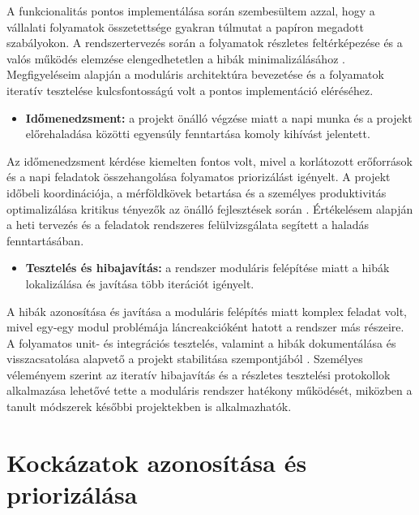A funkcionalitás pontos implementálása során szembesültem azzal, hogy a vállalati folyamatok összetettsége 
gyakran túlmutat a papíron megadott szabályokon. A rendszertervezés során a folyamatok 
részletes feltérképezése és a valós működés elemzése elengedhetetlen a hibák minimalizálásához \cite{Szalay2018,Hajdu2014}. 
Megfigyeléseim alapján a moduláris architektúra bevezetése és a folyamatok iteratív tesztelése kulcsfontosságú volt a pontos implementáció eléréséhez.

\begin{itemize}
    \item \textbf{Időmenedzsment:} a projekt önálló végzése miatt a napi munka és a projekt előrehaladása 
    közötti egyensúly fenntartása komoly kihívást jelentett.
\end{itemize}

Az időmenedzsment kérdése kiemelten fontos volt, mivel a korlátozott erőforrások és a napi feladatok összehangolása 
folyamatos priorizálást igényelt. A projekt időbeli koordinációja, 
a mérföldkövek betartása és a személyes produktivitás optimalizálása kritikus tényezők az önálló fejlesztések során \cite{Kaposi2019,Kovacs2016}. 
Értékelésem alapján a heti tervezés és a feladatok rendszeres felülvizsgálata segített a haladás fenntartásában.

\begin{itemize}
    \item \textbf{Tesztelés és hibajavítás:} a rendszer moduláris felépítése miatt a hibák lokalizálása és javítása több iterációt igényelt.
\end{itemize}

A hibák azonosítása és javítása a moduláris felépítés miatt komplex feladat volt, mivel egy-egy modul problémája 
láncreakcióként hatott a rendszer más részeire. A folyamatos unit- és integrációs 
tesztelés, valamint a hibák dokumentálása és visszacsatolása alapvető a projekt stabilitása szempontjából \cite{Hajdu2014,Szalay2018}. 
Személyes véleményem szerint az iteratív hibajavítás és a részletes tesztelési protokollok alkalmazása lehetővé 
tette a moduláris rendszer hatékony működését, miközben a tanult módszerek későbbi projektekben is alkalmazhatók.

\section{Kockázatok azonosítása és priorizálása}

